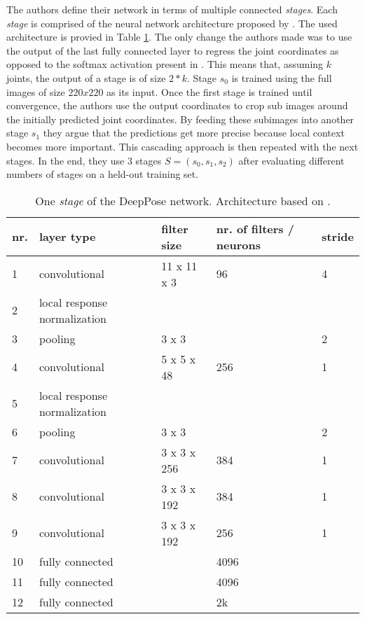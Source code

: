 The authors define their network in terms of multiple connected \textit{stages}.
Each \textit{stage} is comprised of the neural network architecture proposed by \cite{krizhevsky_imagenet_2012}.
The used architecture is provied in Table \ref{tab:deeppose-architecture}.
The only change the authors made was to use the output of the last fully connected layer to regress the joint coordinates as opposed to the softmax activation present in \cite{krizhevsky_imagenet_2012}.
This means that, assuming $k$ joints, the output of a stage is of size $2 * k$.
Stage $s_0$ is trained using the full images of size $220 x 220$ as its input.
Once the first stage is trained until convergence, the authors use the output coordinates to crop sub images around the initially predicted joint coordinates.
By feeding these subimages into another stage $s_1$ they argue that the predictions get more precise because local context becomes more important.
This cascading approach is then repeated with the next stages.
In the end, they use $3$ stages $S = (s_0, s_1, s_2)$ after evaluating different numbers of stages on a held-out training set.

\begin{table}[]
    \begin{tabular}{|l|l|l|l|l|}
    \hline
    \textbf{nr.} & \textbf{layer type} & \textbf{filter size} & \textbf{nr. of filters / neurons} & \textbf{stride} \\ \hline
    1 & convolutional & 11 x 11 x 3 & 96 & 4 \\
    2 & local response normalization &  &  &  \\
    3 & pooling & 3 x 3 &  & 2 \\ \hline
    4 & convolutional & 5 x 5 x 48 & 256 & 1 \\
    5 & local response normalization &  &  &  \\ 
    6 & pooling & 3 x 3 &  & 2 \\ \hline
    7 & convolutional & 3 x 3 x 256 & 384 & 1 \\
    8 & convolutional & 3 x 3 x 192 & 384 & 1 \\
    9 & convolutional & 3 x 3 x 192 & 256 & 1 \\ \hline
    10 & fully connected &  & 4096 &  \\
    11 & fully connected &  & 4096 &  \\ \hline
    12 & fully connected &  & 2k &  \\ \hline
    \end{tabular}
    \caption{One \textit{stage} of the DeepPose network. Architecture based on \cite{krizhevsky_imagenet_2012}.}
    \label{tab:deeppose-architecture}
\end{table}

